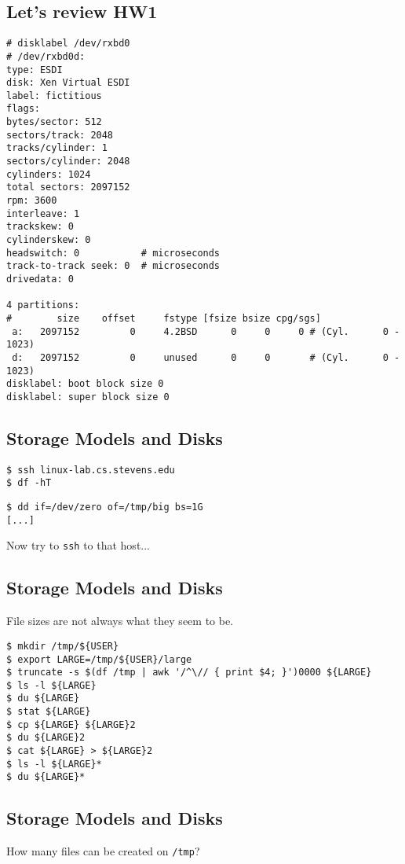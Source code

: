 \documentclass[xga]{xdvislides}
\begin{document}
\subsection{Let's review HW1}
\small
\begin{verbatim}
# disklabel /dev/rxbd0
# /dev/rxbd0d:
type: ESDI
disk: Xen Virtual ESDI
label: fictitious
flags:
bytes/sector: 512
sectors/track: 2048
tracks/cylinder: 1
sectors/cylinder: 2048
cylinders: 1024
total sectors: 2097152
rpm: 3600
interleave: 1
trackskew: 0
cylinderskew: 0
headswitch: 0           # microseconds
track-to-track seek: 0  # microseconds
drivedata: 0 

4 partitions:
#        size    offset     fstype [fsize bsize cpg/sgs]
 a:   2097152         0     4.2BSD      0     0     0 # (Cyl.      0 -   1023)
 d:   2097152         0     unused      0     0       # (Cyl.      0 -   1023)
disklabel: boot block size 0
disklabel: super block size 0
\end{verbatim}
\Normalsize

\subsection{Storage Models and Disks}
\begin{verbatim}
$ ssh linux-lab.cs.stevens.edu
$ df -hT
\end{verbatim}

\begin{verbatim}
$ dd if=/dev/zero of=/tmp/big bs=1G
[...]
\end{verbatim}

Now try to {\tt ssh} to that host...

\subsection{Storage Models and Disks}

File sizes are not always what they seem to be.

\begin{verbatim}
$ mkdir /tmp/${USER}
$ export LARGE=/tmp/${USER}/large
$ truncate -s $(df /tmp | awk '/^\// { print $4; }')0000 ${LARGE}
$ ls -l ${LARGE}
$ du ${LARGE}
$ stat ${LARGE}
$ cp ${LARGE} ${LARGE}2
$ du ${LARGE}2
$ cat ${LARGE} > ${LARGE}2
$ ls -l ${LARGE}*
$ du ${LARGE}*
\end{verbatim}

\subsection{Storage Models and Disks}
How many files can be created on {\tt /tmp}?
\end{document}

